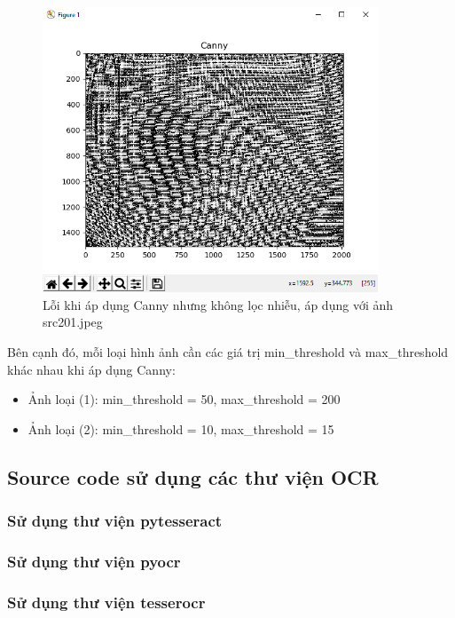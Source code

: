 \documentclass[12pt,a4paper]{article}
\begin{document}
\begin{figure}[ht]
\centering
\includegraphics[width=10cm]{img/canny_error.png}
\caption{Lỗi khi áp dụng Canny nhưng không lọc nhiễu, áp dụng với ảnh src201.jpeg}
\end{figure}

Bên cạnh đó, mỗi loại hình ảnh cần các giá trị min\_threshold và max\_threshold khác nhau khi áp dụng Canny:

\begin{itemize}
	\item Ảnh loại (1): min\_threshold = 50, max\_threshold = 200
	\item Ảnh loại (2): min\_threshold = 10, max\_threshold = 15
\end{itemize}

\subsection{Source code sử dụng các thư viện OCR}

\subsubsection{Sử dụng thư viện pytesseract}



\subsubsection{Sử dụng thư viện pyocr}



\subsubsection{Sử dụng thư viện tesserocr}
\end{document}
